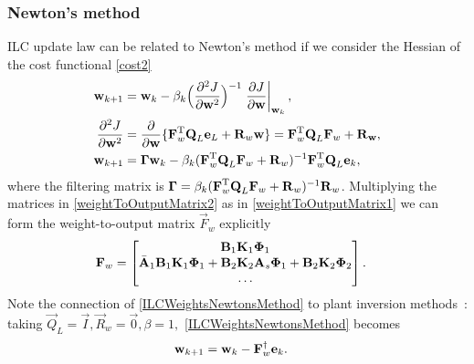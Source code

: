 \subsubsection{Newton's method} ILC update law can be related to Newton's method if we consider the Hessian of the cost functional \eqref{cost2}
%
\begin{equation}
\begin{aligned}
\boldsymbol{\mathrm{w}}_{k+1} &= \boldsymbol{\mathrm{w}}_k - \beta_k\Big(\frac{\partial^{2}J}{\partial\boldsymbol{\mathrm{w}}^{2}}\Big)^{-1}\left.\frac{\partial{J}}{\partial{\boldsymbol{\mathrm{w}}}}\right|_{\boldsymbol{\mathrm{w}}_k}, \\
\frac{\partial^{2}J}{\partial\boldsymbol{\mathrm{w}}^{2}} &= \frac{\partial}{\partial\boldsymbol{\mathrm{w}}}\{\boldsymbol{\mathrm{F}}_{w}^{\mathrm{T}}\boldsymbol{\mathrm{Q}}_L\boldsymbol{\mathrm{e}}_L + \boldsymbol{\mathrm{R}}_w\boldsymbol{\mathrm{w}}\} = \boldsymbol{\mathrm{F}}_{w}^{\mathrm{T}}\boldsymbol{\mathrm{Q}}_L\boldsymbol{\mathrm{F}}_{w} + \boldsymbol{\mathrm{R}}_{\boldsymbol{\mathrm{w}}}, \\
\boldsymbol{\mathrm{w}}_{k+1} &= \boldsymbol{\mathrm{\Gamma}}\boldsymbol{\mathrm{w}}_k - \beta_k(\boldsymbol{\mathrm{F}}_{w}^{\mathrm{T}}\boldsymbol{\mathrm{Q}}_L\boldsymbol{\mathrm{F}}_{w} + \boldsymbol{\mathrm{R}}_{w})^{-1}\boldsymbol{\mathrm{F}}_{w}^{\mathrm{T}}\boldsymbol{\mathrm{Q}}_L\boldsymbol{\mathrm{e}}_k,
\end{aligned}
\label{ILCWeightsNewtonsMethod}
\end{equation}
%
\noindent where the filtering matrix is $\boldsymbol{\mathrm{\Gamma}} = \beta_k(\boldsymbol{\mathrm{F}}_{w}^{\mathrm{T}}\boldsymbol{\mathrm{Q}}_L\boldsymbol{\mathrm{F}}_{w} + \boldsymbol{\mathrm{R}}_{w})^{-1}\boldsymbol{\mathrm{R}}_{w}$. Multiplying the matrices in \eqref{weightToOutputMatrix2} as in \eqref{weightToOutputMatrix1} we can form the weight-to-output matrix $\vec{F}_{w}$ explicitly
%
\begin{equation}
\begin{aligned}
\boldsymbol{\mathrm{F}}_{w} &= \begin{bmatrix}
  \boldsymbol{\mathrm{B}}_1 \boldsymbol{\mathrm{K}}_1 \boldsymbol{\mathrm{\Phi}}_1 \\
  \bar{\boldsymbol{\mathrm{A}}}_1\boldsymbol{\mathrm{B}}_1\boldsymbol{\mathrm{K}}_1\boldsymbol{\mathrm{\Phi}}_1 + \boldsymbol{\mathrm{B}}_2\boldsymbol{\mathrm{K}}_2\boldsymbol{\mathrm{A}}_s\boldsymbol{\mathrm{\Phi}}_1 + \boldsymbol{\mathrm{B}}_2\boldsymbol{\mathrm{K}}_2\boldsymbol{\mathrm{\Phi}}_2 \\
  \ldots
 \end{bmatrix}.
\end{aligned}
\label{weightToOutputMatrixExpanded}
\end{equation}
%
Note the connection of \eqref{ILCWeightsNewtonsMethod} to plant inversion methods~\cite{Bristow06}: taking $\vec{Q}_L = \vec{I}, \vec{R}_{w} = \vec{0}, \beta = 1,$ \eqref{ILCWeightsNewtonsMethod} becomes
%
\begin{equation}
\begin{aligned}
\boldsymbol{\mathrm{w}}_{k+1} &= \boldsymbol{\mathrm{w}}_k - \boldsymbol{\mathrm{F}}_{w}^{\dagger}\boldsymbol{\mathrm{e}}_k.
\end{aligned}
\label{ILCPlantInversion}
\end{equation}
